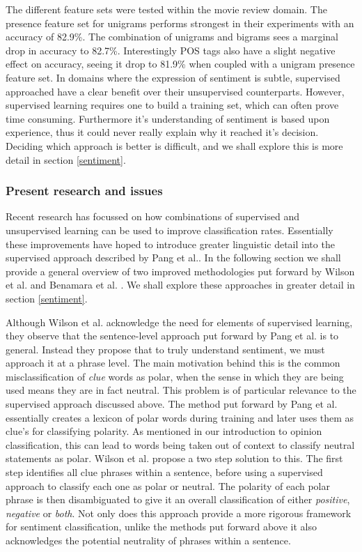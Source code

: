 The different feature sets were tested within the movie review domain. The presence feature set for unigrams performs strongest in their experiments with an accuracy of 82.9\%. The combination of unigrams and bigrams sees a marginal drop in accuracy to 82.7\%. Interestingly POS tags also have a slight negative effect on accuracy, seeing it drop to 81.9\% when coupled with a unigram presence feature set. In domains where the expression of sentiment is subtle, supervised approached have a clear benefit over their unsupervised counterparts. However, supervised learning requires one to build a training set, which can often prove time consuming. Furthermore it's understanding of sentiment is based upon experience, thus it could never really explain why it reached it's decision. Deciding which approach is better is difficult, and we shall explore this is more detail in section \ref{sentiment}.

\subsubsection{Present research and issues}

Recent research has focussed on how combinations of supervised and unsupervised learning can be used to improve classification rates. Essentially these improvements have hoped to introduce greater linguistic detail into the supervised approach described by Pang et al.. In the following section we shall provide a general overview of two improved methodologies put forward by Wilson et al. \cite{Wilson:2005tt} and Benamara et al. \cite{Benamara:2007wz}.  We shall explore these approaches in greater detail in section \ref{sentiment}.

Although Wilson et al. \cite{Wilson:2005tt} acknowledge the need for elements of supervised learning, they observe that the sentence-level approach put forward by Pang et al. is to general. Instead they propose that to truly understand sentiment, we must approach it at a phrase level. The main motivation behind this is the common misclassification of \emph{clue} words as polar, when the sense in which they are being used means they are in fact neutral. This problem is of particular relevance to the supervised approach discussed above. The method put forward by Pang et al. essentially creates a lexicon of polar words during training and later uses them as clue's for classifying polarity. As mentioned in our introduction to opinion classification, this can lead to words being taken out of context to classify neutral statements as polar. Wilson et al. propose a two step solution to this. The first step identifies all clue phrases within a sentence, before using a supervised approach to classify each one as polar or neutral. The polarity of each polar phrase is then disambiguated to give it an overall classification of either \emph{positive}, \emph{negative} or \emph{both}. Not only does this approach provide a more rigorous framework for sentiment classification, unlike the methods put forward above it also acknowledges the potential neutrality of phrases within a sentence.

